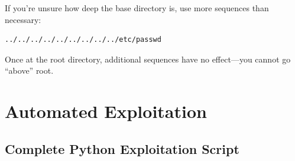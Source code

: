 \documentclass[11pt,letterpaper]{article}
\newcommand{\code}[1]{\texttt{\detokenize{#1}}}
\begin{document}
\begin{notebox}
If you're unsure how deep the base directory is, use more \code{../} sequences than necessary:
\begin{lstlisting}
../../../../../../../../../etc/passwd
\end{lstlisting}
Once at the root directory, additional \code{../} sequences have no effect---you cannot go ``above'' root.
\end{notebox}

\section{Automated Exploitation}

\subsection{Complete Python Exploitation Script}
\end{document}
